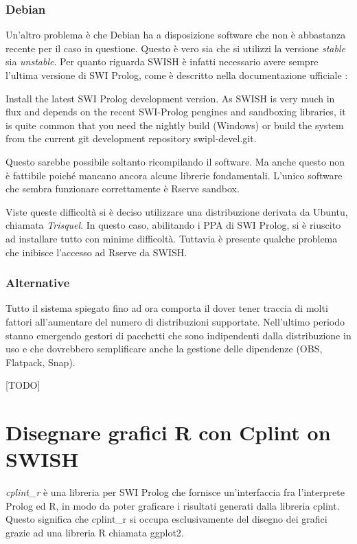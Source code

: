 \documentclass[10pt,titlepage,twoside,a4paper]{report}
\begin{document}
\subsection{Debian}
Un'altro problema è che Debian ha a disposizione software che non è
abbastanza recente per il caso in questione. Questo è vero sia che si 
utilizzi la versione \emph{stable} sia \emph{unstable}. Per quanto riguarda 
SWISH è infatti necessario avere sempre l'ultima versione di SWI Prolog,
come è descritto nella documentazione ufficiale \cite{lastestSWIProlog}:
\begin{displayquote}
Install the latest  SWI Prolog development version. As SWISH is very much in 
flux and depends on the recent SWI-Prolog pengines and sandboxing libraries, 
it is quite common that you need the nightly build (Windows) or build the 
system from the current git development repository swipl-devel.git.
\end{displayquote}

Questo sarebbe possibile  soltanto ricompilando il software. Ma anche questo 
non è fattibile poiché mancano ancora alcune librerie fondamentali. L'unico 
software che sembra funzionare correttamente è Rserve sandbox.

Viste queste difficoltà si è deciso utilizzare una distribuzione derivata 
da Ubuntu, chiamata \emph{Trisquel}. In questo caso, abilitando i PPA di SWI 
Prolog\cite{SWIPrologPPA}, si è riuscito ad installare tutto con minime 
difficoltà. Tuttavia è presente qualche problema che inibisce l'accesso ad 
Rserve da SWISH.

\subsection{Alternative}
Tutto il sistema spiegato fino ad ora comporta il dover tener traccia di 
molti fattori all'aumentare del numero di distribuzioni supportate. Nell'ultimo 
periodo stanno emergendo gestori di pacchetti che sono indipendenti dalla 
distribuzione in uso e che dovrebbero semplificare anche la gestione delle 
dipendenze (OBS, Flatpack, Snap).

[TODO]




\chapter{Disegnare grafici R con Cplint on SWISH} 
\label{disegnare-grafici-r-con-cplint-on-swish}
\emph{cplint\_r} è una libreria per SWI Prolog che fornisce un'interfaccia 
fra l'interprete Prolog ed R, in modo da poter graficare i risultati generati 
dalla libreria cplint. Questo significa che cplint\_r si occupa esclusivamente 
del disegno dei grafici grazie ad una libreria R chiamata ggplot2.
\end{document}
